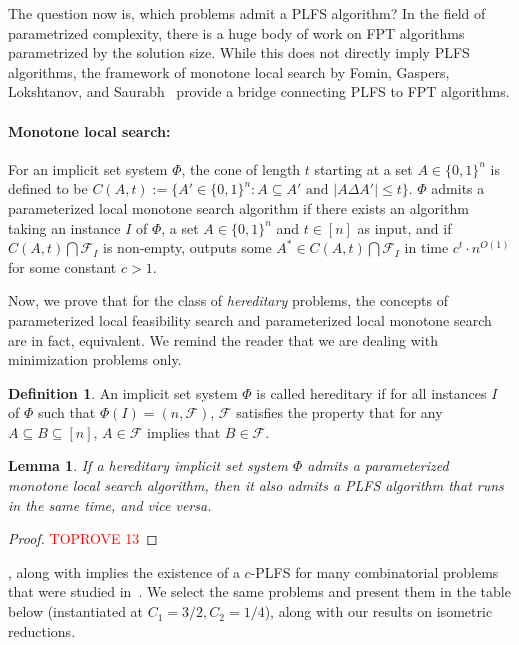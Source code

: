 \documentclass[11pt, letterpaper]{article}
\newtheorem{lemma}[theorem]{Lemma}
\theoremstyle{definition}
\newtheorem{definition}{Definition}
\newcommand{\Q}[1]{\{0,1\}^{#1}}
\newcommand{\calf}{\mathcal{F}}
\begin{document}
The question now is, which problems admit a PLFS algorithm? In the field of parametrized complexity, there is a huge body of work on FPT algorithms parametrized by the solution size. While this does not directly imply PLFS algorithms, the framework of monotone local search by Fomin, Gaspers, Lokshtanov, and Saurabh~\cite{ConicSearch} provide a bridge connecting PLFS to FPT algorithms. 

\paragraph{Monotone local search:} For an implicit set system $\Phi$, the cone of length $t$ starting at a set $A \in \Q{n}$ is defined to be $C(A,t):= \{A' \in \Q{n}: A \subseteq A' \text{  and } |A \Delta A'| \leq t\}$. $\Phi$ admits a parameterized local monotone search algorithm if there exists an algorithm taking an instance $I$ of $\Phi$, a set $A \in \Q{n}$ and $t \in [n]$ as input, and if $C(A,t) \bigcap \calf_I$ is non-empty, outputs some $A^* \in C(A,t) \bigcap \calf_I$ in time $c^t\cdot n^{O(1)}$ for some constant $c>1$. 

Now, we prove that for the class of \emph{hereditary} problems, the concepts of parameterized local feasibility search and parameterized local monotone search are in fact, equivalent. We remind the reader that we are dealing with minimization problems only. 
\begin{definition}
    An implicit set system $\Phi$ is called hereditary if for all instances $I$ of $\Phi$ such that $\Phi(I)=\left(n ,\calf\right)$, $\calf$ satisfies the property that for any $A \subseteq B \subseteq [n]$, $A \in \mathcal{F}$ implies that $B \in \mathcal{F}$.
\end{definition}

\begin{lemma} \label{lem:heriditary}
    If a hereditary implicit set system $\Phi$ admits a parameterized monotone local search algorithm, then it also admits a PLFS algorithm that runs in the same time, and vice versa. 
\end{lemma}
\begin{proof}\textcolor{red}{TOPROVE 13}\end{proof}
, along with  implies the existence of a $c$-PLFS for many combinatorial problems that were studied in~\cite{ConicSearch}. We select the same problems and present them in the table below (instantiated at $C_1=3/2, C_2=1/4$), along with our results on isometric reductions.
\end{document}
